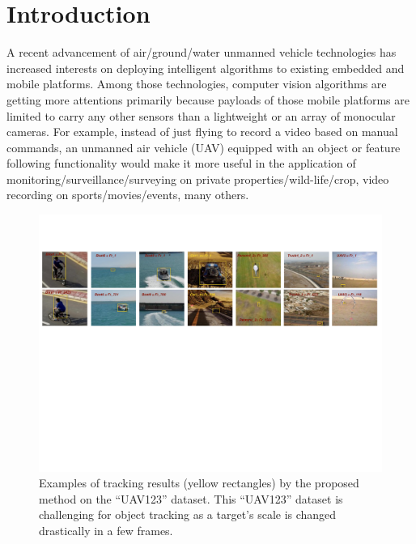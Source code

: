 \documentclass[10pt,twocolumn,letterpaper]{article}
\begin{document}
\section{Introduction}
A recent advancement of air/ground/water unmanned vehicle technologies
has increased interests on deploying intelligent algorithms to
existing embedded and mobile platforms. Among those technologies,
computer vision algorithms are getting more attentions primarily
because payloads of those mobile platforms are limited to carry any
other sensors than a lightweight or an array of monocular cameras. For
example, instead of just flying to record a video based on manual
commands, an unmanned air vehicle (UAV) equipped with an object or
feature following functionality would make it more useful in the
application of monitoring/surveillance/surveying on private
properties/wild-life/crop, video recording on sports/movies/events,
many others.

\begin{figure}[!h]
\centering
\includegraphics[width=\textwidth]{./figures/ResultsIntroduction.pdf}
\caption{Examples of tracking results (yellow rectangles) by the
  proposed method on the ``UAV123'' dataset. This ``UAV123'' dataset
  is challenging for object tracking as a target's scale is changed
  drastically in a few frames.}
\label{ResultsIntroduction}
\end{figure}
\end{document}
